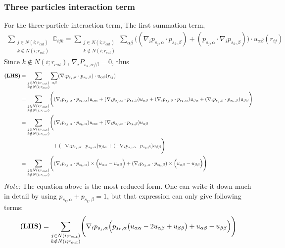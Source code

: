 \documentclass[11pt, oneside]{article}   	%
\begin{document}
\subsubsection{Three particles interaction term}
For the three-particle interaction term, 
The first summation term,
\begin{align}
 \sum_{\substack{j \in N(i;r_{cut}) \\ k \notin N(i;r_{cut})}} \mathbb{C}_{ijk} = \sum_{\substack{j \in N(i;r_{cut}) \\ k \notin N(i;r_{cut})}} \sum_{\alpha \beta} \Biggl( (\nabla_i p_{s_j,\alpha} \cdot p_{s_k,\beta}) + (p_{s_j,\alpha} \cdot \nabla_i p_{s_k,\beta}) \Biggr) \cdot u_{\alpha \beta} (r_{ij})
\end{align}
Since $k \notin N(i;r_{cut})$, $\nabla_i P_{s_k, \alpha/\beta} = 0 $, thus
\begin{align} \notag
\textbf{(LHS)} &= \sum_{\substack{j \in N(i;r_{cut}) \\ k \notin N(i;r_{cut})}} \sum_{\alpha\beta} (\nabla_i p_{s_j,\alpha} \cdot p_{s_k,\beta}) \cdot u_{\alpha \beta} (r_{ij})\\
 &= \sum_{\substack{j \in N(i;r_{cut}) \\ k \notin N(i;r_{cut})}}   \Biggl( (\nabla_i p_{s_j,\alpha} \cdot p_{s_k,\alpha}) u_{\alpha \alpha} +(\nabla_i p_{s_j,\alpha} \cdot p_{s_k,\beta}) u_{\alpha \beta} +(\nabla_i p_{s_j,\beta} \cdot p_{s_k,\alpha}) u_{\beta \alpha} +(\nabla_i p_{s_j,\beta} \cdot p_{s_k,\beta}) u_{\beta \beta}  \Biggr) \notag \\ \notag
 &= \sum_{\substack{j \in N(i;r_{cut}) \\ k \notin N(i;r_{cut})}}   \Biggl(  (\nabla_i p_{s_j,\alpha} \cdot p_{s_k,\alpha}) u_{\alpha \alpha} +  (\nabla_i p_{s_j,\alpha} \cdot p_{s_k,\beta}) u_{\alpha \beta} \\
 & \qquad  \qquad \qquad \, +(-\nabla_i p_{s_j,\alpha} \cdot p_{s_k,\alpha}) u_{\beta \alpha} + (-\nabla_i p_{s_j,\alpha} \cdot p_{s_k,\beta})u_{\beta \beta}  \Biggr) \notag \\
 &= \sum_{\substack{j \in N(i;r_{cut}) \\ k \notin N(i;r_{cut})}}   \Biggl(  (\nabla_i p_{s_j,\alpha} \cdot p_{s_k,\alpha}) \times \Bigl(u_{\alpha \alpha}-u_{\alpha \beta}\Bigr) +  (\nabla_i p_{s_j,\alpha} \cdot p_{s_k,\beta}) \times \Bigl(u_{\alpha \beta} -u_{\beta \beta}\Bigr) \Biggr) \notag 
\end{align}
\textit{Note:} The equation above is the most reduced form. One can write it down much in detail by using $p_{s_k,\alpha}+p_{s_k,\beta} = 1$, but that expression can only give following terms:
\begin{align*}
\textbf{(LHS)} =  \sum_{\substack{j \in N(i;r_{cut}) \\ k \notin N(i;r_{cut})}}  \Biggl( \nabla_i p_{s_j,\alpha} \Bigl( p_{s_k,\alpha} \bigl( u_{\alpha \alpha} -2 u_{\alpha \beta} + u_{\beta \beta} \bigr) +u_{\alpha \beta} -u_{\beta \beta} \Bigr) \Biggr)
\end{align*}
\end{document}
